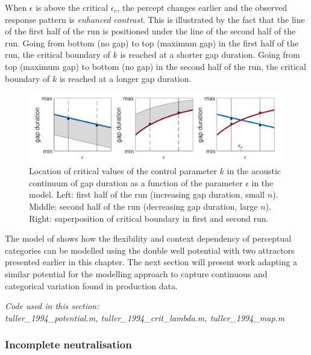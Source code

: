 When $\epsilon$ is above the critical $\epsilon_c$, the percept changes earlier and the observed response pattern is \emph{enhanced contrast}. This is illustrated by the fact that the line of the first half of the run  is positioned under the line of the second half of the run. Going from bottom (no gap) to top (maximum gap) in the first half of the run, the critical boundary of $k$ is reached at a shorter gap duration. Going from top (maximum gap) to bottom (no gap) in the second half of the run, the critical boundary of $k$ is reached at a longer gap duration.

\begin{figure}[h]
\begin{center}
\includegraphics[width=\textwidth]{figures/ch3/tuller_lambda_epsilon_plane.pdf}
\caption[Location of critical values of the control parameter $k$ in the acoustic continuum of gap duration as a function of the parameter $\epsilon$ in the \citet{Tulleretal1994} model.]{Location of critical values of the control parameter $k$ in the acoustic continuum of gap duration as a function of the parameter $\epsilon$ in the \citet{Tulleretal1994} model. Left: first half of the run (increasing gap duration, small $n$). Middle: second half of the run (decreasing gap duration, large $n$). Right: superposition of critical boundary in first and second run.}
\label{fig:tuller_lambda_epsilon}
\end{center}
\end{figure}

The model of \citet{Tulleretal1994} shows how the flexibility and context dependency of perceptual categories can be modelled using the double well potential with two attractors presented earlier in this chapter. The next section will present work adapting a similar potential for the modelling approach to capture continuous and categorical variation found in production data.

\medskip\noindent \textit{Code used in this section:\\
tuller\_1994\_potential.m, tuller\_1994\_crit\_lambda.m, tuller\_1994\_map.m}

\subsubsection{Incomplete neutralisation}

